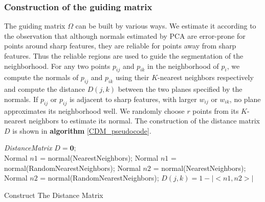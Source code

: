\subsubsection{Construction of the guiding matrix}
The guiding matrix $\Omega$ can be built by various ways. We estimate it according to the observation that although normals estimated by PCA are error-prone for points around sharp features, they are reliable for points away from sharp features. Thus the reliable regions are used to guide the segmentation of the neighborhood.
For any two points $p_{ij}$ and $p_{ik}$ in the neighborhood of $p_i$, we compute the normals of $p_{ij}$ and $p_{ik}$ using their $K$-nearest neighbors respectively and compute the distance $D(j,k)$ between the two planes specified by the normals.
If $p_{ij}$ or $p_{ij}$ is adjacent to sharp features, \ie with larger $w_{ij}$ or $w_{ik}$, no plane approximates its neighborhood well. We randomly choose $r$ points from its $K$-nearest neighbors to estimate its normal. The construction of the distance matrix $D$ is shown in \textbf{algorithm} \ref{CDM_pseudocode}.

\begin{algorithm}[t]
\linesnumbered {} 
\BlankLine

\emph{DistanceMatrix} $D=\textbf{0}$;\\
 {
    {
    {
     Normal $n1$ = normal(NearestNeighbors);
     }
    \Else
    {
     Normal $n1$ = normal(RandomNearestNeighbors);
    }
    {
     Normal $n2$ = normal(NearestNeighbors);
     }
    \Else
    {
     Normal $n2$ = normal(RandomNearestNeighbors);
    }
    $D(j,k) = 1 - |<n1,n2>|$
    }
}  \caption{Construct The Distance Matrix} \label{CDM_pseudocode}
\end{algorithm}

